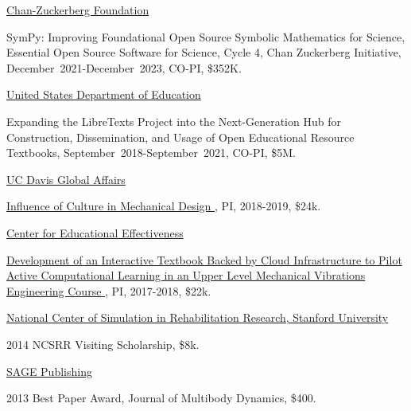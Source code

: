 \documentclass[10pt]{article}
\newenvironment{innerlist}[1][\enskip\textbullet]%
        {\begin{compactitem}[#1]}{\end{compactitem}}
\newcommand{\blankline}{\quad\pagebreak[2]}
\begin{document}
\href{https://www.chanzuckerberg.com}{Chan-Zuckerberg Foundation}
\begin{innerlist}
  \item SymPy: Improving Foundational Open Source Symbolic Mathematics for
    Science, Essential Open Source Software for Science, Cycle 4, Chan
    Zuckerberg Initiative, December~2021-December~2023, CO-PI, \$352K.
\end{innerlist}

\blankline

\href{https://www.ed.gov}{United States Department of Education}
\begin{innerlist}
\item Expanding the LibreTexts Project into the Next-Generation Hub for
  Construction, Dissemination, and Usage of Open Educational Resource
  Textbooks, September~2018-September~2021, CO-PI, \$5M.
\end{innerlist}

\blankline

\href{https://globalaffairs.ucdavis.edu}{UC Davis Global Affairs}
\begin{innerlist}
\item \href{https://doi.org/10.6084/m9.figshare.5656105}{
      Influence of Culture in Mechanical Design
    }, PI, 2018-2019, \$24k.
\end{innerlist}

\blankline

\href{http://cee.ucdavis.edu/}{Center for Educational Effectiveness}
\begin{innerlist}
\item \href{https://doi.org/10.6084/m9.figshare.5229886.v1}{
      Development of an Interactive Textbook Backed by Cloud Infrastructure to
      Pilot Active Computational Learning in an Upper Level Mechanical
      Vibrations Engineering Course
    }, PI, 2017-2018, \$22k.
\end{innerlist}

\blankline

\href{http://opensim.stanford.edu/}{National Center of Simulation in
  Rehabilitation Research, Stanford University}
\begin{innerlist}
  \item 2014 NCSRR Visiting Scholarship, \$8k.
\end{innerlist}

\blankline

\href{http://sagepub.com/}{SAGE Publishing}
\begin{innerlist}
  \item 2013 Best Paper Award, Journal of Multibody Dynamics, \$400.
\end{innerlist}
\end{document}
